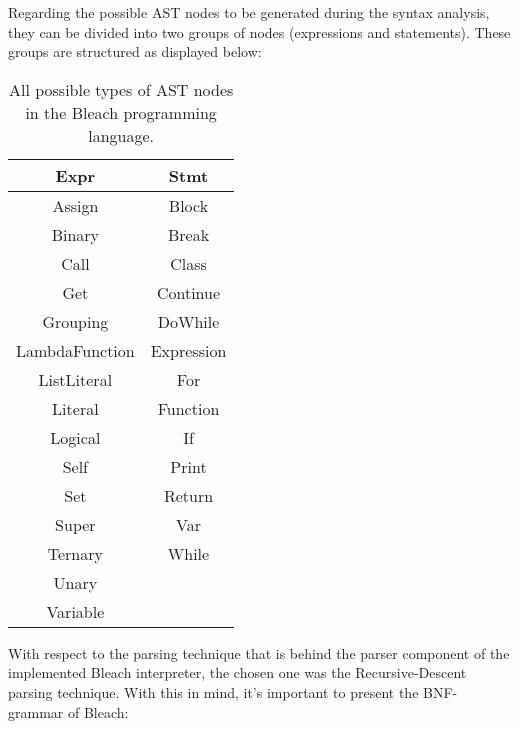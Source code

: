 Regarding the possible AST nodes to be generated during the syntax analysis, they can be divided into two groups of nodes (expressions and statements). These groups are structured as displayed below:

\begin{table}[h!]
\centering
    \begin{tabular}{|c|c|}
    \hline
    \textbf{Expr} & \textbf{Stmt} \\ \hline
    Assign & Block \\ \hline
    Binary & Break \\ \hline
    Call & Class \\ \hline
    Get & Continue \\ \hline
    Grouping & DoWhile \\ \hline
    LambdaFunction & Expression \\ \hline
    ListLiteral & For \\ \hline
    Literal & Function \\ \hline
    Logical & If \\ \hline
    Self & Print \\ \hline
    Set & Return \\ \hline
    Super & Var \\ \hline  
    Ternary & While \\ \hline
    Unary &  \\ \hline
    Variable &  \\ \hline
    \end{tabular}
    \label{tab:ASTNodes}  %
    \caption{All possible types of AST nodes in the Bleach programming language. \newline}
\end{table}

\newpage

With respect to the parsing technique that is behind the parser component of the implemented Bleach interpreter, the chosen one was the Recursive-Descent parsing technique. With this in mind, it's important to present the BNF-grammar of Bleach: 

